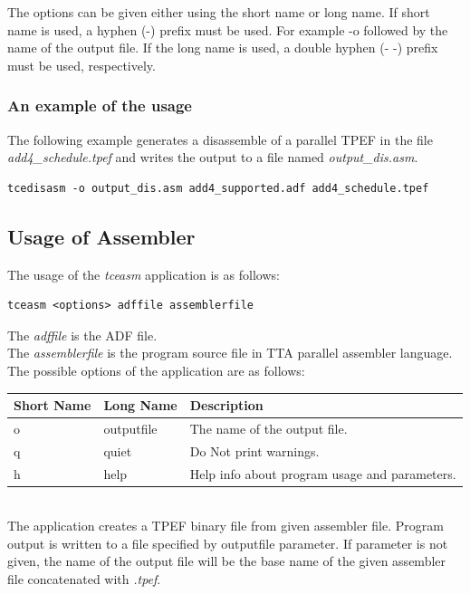 \documentclass[twoside]{tceusermanual}
\begin{document}
The options can be given either using the short name or long name. If
short name is used, a hyphen (-) prefix must be used. For example -o
followed by the name of the output file. If the long name is used, a
double hyphen (- -) prefix must be used, respectively.

\subsubsection{An example of the usage}

The following example generates a disassemble of a parallel TPEF in the file
\emph{add4\_schedule.tpef} and writes the output to a file named
\emph{output\_dis.asm}.
 
\begin{verbatim}
tcedisasm -o output_dis.asm add4_supported.adf add4_schedule.tpef 
\end{verbatim}

\subsection{Usage of Assembler}

The usage of the \emph{tceasm} application is as follows:

\begin{verbatim}
tceasm <options> adffile assemblerfile
\end{verbatim}

The \emph{adffile} is the ADF file.\\
The \emph{assemblerfile} is the program source file in TTA parallel assembler
language.\\

The possible options of the application are as follows:\\

\begin{tabular}{p{}p{}
                p{}}
\textbf{Short Name} &\textbf{Long Name} &\textbf{Description} \\
\hline
o & outputfile  & The name of the output file.\\
q & quiet       & Do Not print warnings.\\
h & help        & Help info about program usage and parameters.\\
\end{tabular}\\

The application creates a TPEF binary file from given assembler file. 
Program output is written to a file specified by outputfile parameter. If
parameter is not given, the name of the output file will be the base name of
the given assembler file concatenated with \emph{.tpef}.
\end{document}
